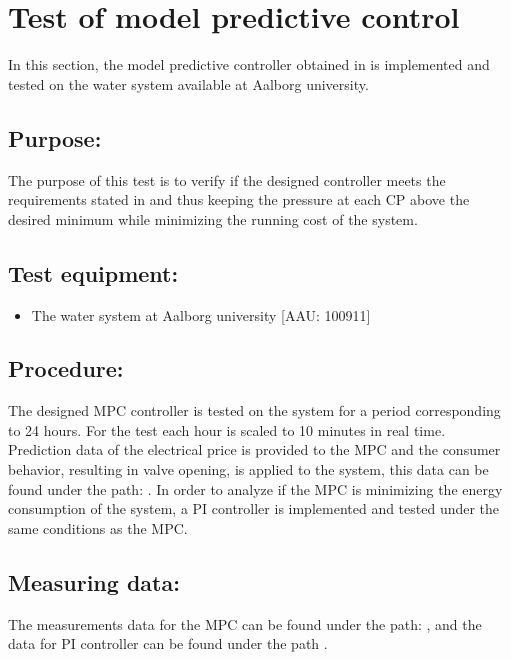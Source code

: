 \section{Test of model predictive control}
\label{sec:MPT_test}

In this section, the model predictive controller obtained in  is implemented and tested on the water system available at Aalborg university. 

\subsection*{Purpose:}

The purpose of this test is to verify if the designed controller meets the requirements stated in  and thus keeping the pressure at each CP above the desired minimum while minimizing the running cost of the system.

\subsection*{Test equipment:}
\begin{itemize}
\item The water system at Aalborg university [AAU: 100911]
\end{itemize}

\subsection*{Procedure:}
The designed MPC controller is tested on the system for a period corresponding to 24 hours. For the test each hour is scaled to 10 minutes in real time. Prediction data of the electrical price is provided to the MPC and the consumer behavior, resulting in valve opening, is applied to the system, this data can be found under the path: . 
In order to analyze if the MPC is minimizing the energy consumption of the system, a PI controller is implemented and tested under the same conditions as the MPC.    

\subsection*{Measuring data:}
The measurements data for the MPC can be found under the path: , and the data for PI controller can be found under the path . 

